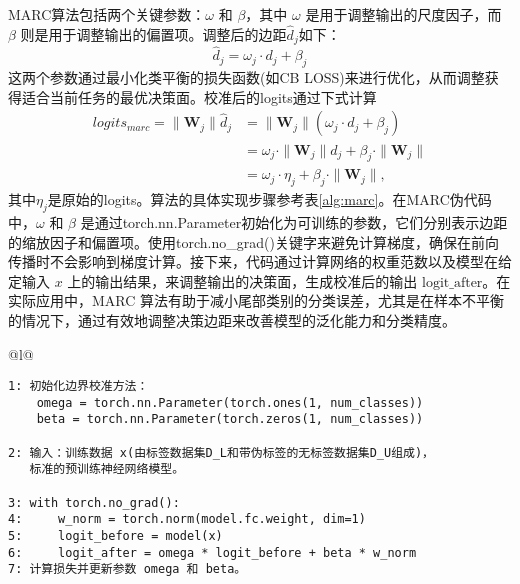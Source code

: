 \documentclass[master]{thesis-uestc}
\begin{document}
MARC算法包括两个关键参数：$\omega$ 和 $\beta$，其中 $\omega$ 是用于调整输出的尺度因子，而 $\beta$ 则是用于调整输出的偏置项。调整后的边距$\hat{d}_j$如下：
\begin{equation}
    \hat{d}_j = \omega_j \cdot d_j + \beta_j
\end{equation}
这两个参数通过最小化类平衡的损失函数(如CB LOSS)来进行优化，从而调整获得适合当前任务的最优决策面。校准后的logits通过下式计算
\begin{equation}
    \begin{split}
    logits_{marc} = \| \mathbf{W}_j \| \hat{d}_j &= \| \mathbf{W}_j \| (\omega_j \cdot d_j + \beta_j) \\
    &= \omega_j \cdot \| \mathbf{W}_j \| d_j + \beta_j \cdot \| \mathbf{W}_j \| \\
    &= \omega_j \cdot \eta_j + \beta_j \cdot \| \mathbf{W}_j \|,
    \end{split}
\end{equation}
其中$\eta_j$是原始的logits。算法的具体实现步骤参考表\ref{alg:marc}。在MARC伪代码中，$\omega$ 和 $\beta$ 是通过torch.nn.Parameter初始化为可训练的参数，它们分别表示边距的缩放因子和偏置项。使用torch.no\_grad()关键字来避免计算梯度，确保在前向传播时不会影响到梯度计算。接下来，代码通过计算网络的权重范数以及模型在给定输入 $x$ 上的输出结果，来调整输出的决策面，生成校准后的输出 $\text{logit\_after}$。在实际应用中，MARC 算法有助于减小尾部类别的分类误差，尤其是在样本不平衡的情况下，通过有效地调整决策边距来改善模型的泛化能力和分类精度。
\begin{table}[h]
    \centering
    \begin{tabular}{@{}l@{}} %
    \toprule
     \\ %
    \midrule
    \begin{lstlisting}[basicstyle=\ttfamily,frame=none]
1: 初始化边界校准方法：
    omega = torch.nn.Parameter(torch.ones(1, num_classes))
    beta = torch.nn.Parameter(torch.zeros(1, num_classes))

2: 输入：训练数据 x(由标签数据集D_L和带伪标签的无标签数据集D_U组成)，
   标准的预训练神经网络模型。

3: with torch.no_grad():
4:     w_norm = torch.norm(model.fc.weight, dim=1)
5:     logit_before = model(x)
6:     logit_after = omega * logit_before + beta * w_norm
7: 计算损失并更新参数 omega 和 beta。
    \end{lstlisting} \\
    \hline
    \end{tabular}
    \caption{MARC 算法的实现伪代码}
    \label{alg:marc}
\end{table}
\FloatBarrier  %
\end{document}
